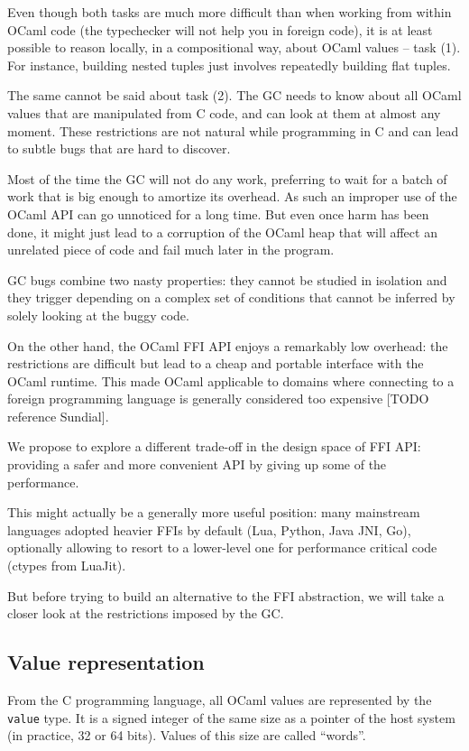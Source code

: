 \documentclass[a4paper]{easychair}
\begin{document}
Even though both tasks are much more difficult than when working from
within OCaml code (the typechecker will not help you in foreign code),
it is at least possible to reason locally, in a compositional way, about
OCaml values -- task (1). For instance, building nested tuples just
involves repeatedly building flat tuples.

The same cannot be said about task (2). The GC needs to know about all
OCaml values that are manipulated from C code, and can look at them at
almost any moment. These restrictions are not natural while programming
in C and can lead to subtle bugs that are hard to discover.

Most of the time the GC will not do any work, preferring to wait for a
batch of work that is big enough to amortize its overhead. As such an
improper use of the OCaml API can go unnoticed for a long time. But even
once harm has been done, it might just lead to a corruption of the OCaml
heap that will affect an unrelated piece of code and fail much later in the
program.

GC bugs combine two nasty properties: they cannot be studied in
isolation and they trigger depending on a complex set of conditions that
cannot be inferred by solely looking at the buggy code.

On the other hand, the OCaml FFI API enjoys a remarkably low overhead:
the restrictions are difficult but lead to a cheap and portable
interface with the OCaml runtime. This made OCaml applicable to domains
where connecting to a foreign programming language is generally
considered too expensive {[}TODO reference Sundial{]}.

We propose to explore a different trade-off in the design space of FFI
API: providing a safer and more convenient API by giving up some of the
performance.

This might actually be a generally more useful position: many mainstream
languages adopted heavier FFIs by default (Lua, Python, Java JNI, Go),
optionally allowing to resort to a lower-level one for performance critical
code (ctypes from LuaJit).

But before trying to build an alternative to the FFI abstraction, we will take
a closer look at the restrictions imposed by the GC.

\subsection{Value representation}

From the C programming language, all OCaml values are represented by the
\texttt{value} type. It is a signed integer of the same size as a
pointer of the host system (in practice, 32 or 64 bits). Values of this
size are called ``words''.
\end{document}
